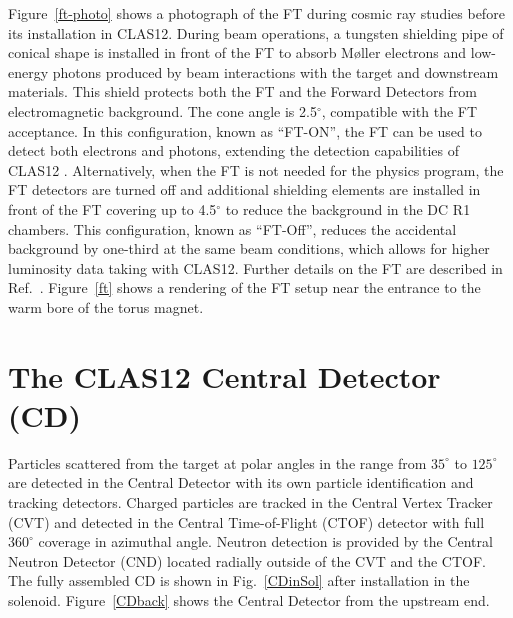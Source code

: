 \documentclass[final,3p,twocolumn]{elsarticle}
\begin{document}
Figure~\ref{ft-photo} shows a photograph of the FT during cosmic ray studies before its installation in CLAS12.
During beam operations, a tungsten shielding pipe of conical shape is installed in front of the FT to absorb
M{\o}ller electrons and low-energy photons produced by beam interactions with the target and downstream materials.
This shield protects both the FT and the Forward Detectors from electromagnetic background. The cone angle is
2.5$^\circ$, compatible with the FT acceptance. In this configuration, known as ``FT-ON'', the FT can be used to
detect both electrons and photons, extending the detection capabilities of CLAS12 . Alternatively, when the FT is not
needed for the physics program, the FT detectors are turned off and additional shielding elements are installed in
front of the FT covering up to 4.5$^\circ$ to reduce the background in the DC R1 chambers. This configuration, known
as ``FT-Off'', reduces the accidental background by one-third at the same beam conditions, which allows for higher
luminosity data taking with CLAS12.  Further details on the FT are described in Ref.~\cite{FT}. Figure~\ref{ft} shows
a rendering of the FT setup near the entrance to the warm bore of the torus magnet.   

\section{The CLAS12 Central Detector (CD)}

Particles scattered from the target at polar angles in the range from $35^\circ$  to $125^\circ$ are detected in the
Central Detector with its own particle identification and tracking detectors. Charged particles are tracked in the
Central Vertex Tracker (CVT) and detected in the Central Time-of-Flight (CTOF) detector with full $360^\circ$
coverage in azimuthal angle. Neutron detection is provided by the Central Neutron Detector (CND) located radially
outside of the CVT and the CTOF.  The fully assembled CD is shown in Fig.~\ref{CDinSol} after installation in the
solenoid. Figure~\ref{CDback} shows the Central Detector from the upstream end.
\end{document}
